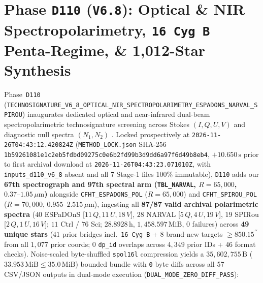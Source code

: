 \documentclass[twocolumn,10pt]{article}
\begin{document}
\section{Phase \texttt{D110} (\texttt{V6.8}): Optical \& NIR Spectropolarimetry, \texttt{16\,Cyg\,B} Penta-Regime, \& 1,012-Star Synthesis}
\label{sec:d110}
Phase~\texttt{D110} (\texttt{TECHNOSIGNATURE\_\allowbreak V6\_8\_\allowbreak OPTICAL\_\allowbreak NIR\_\allowbreak SPECTROPOLARIMETRY\_\allowbreak ESPADONS\_\allowbreak NARVAL\_\allowbreak SPIROU}) inaugurates dedicated optical and near-infrared dual-beam spectropolarimetric technosignature screening across Stokes $(I, Q, U, V)$ and diagnostic null spectra $(N_1, N_2)$ \cite{Donati1997,Auriere2003,Petit2014,Donati2020,Cook2022}. Locked prospectively at \texttt{2026-11-26T04:43:12.420824Z} (\texttt{METHOD\_LOCK.json} SHA-256 \texttt{1b592610\allowbreak 81e1c2eb\allowbreak 5fdbd092\allowbreak 75c0e6b2\allowbreak fd99b3d9\allowbreak dd6a97f6\allowbreak d49b8eb4}, $+10.650\,\text{s}$ prior to first archival download at \texttt{2026-11-26T04:43:23.071010Z}, with \texttt{inputs\_d110\_v6\_8} absent and all 7 Stage-1 files 100\% immutable), \texttt{D110} adds our \textbf{67th spectrograph and 97th spectral arm (\texttt{TBL\_NARVAL}, $R=65{,}000$, $0.37\text{--}1.05\,\mu\text{m}$)} alongside \texttt{CFHT\_ESPADONS\_POL} ($R=65{,}000$) and \texttt{CFHT\_SPIROU\_POL} ($R=70{,}000$, $0.955\text{--}2.515\,\mu\text{m}$), ingesting all \textbf{87/87 valid archival polarimetric spectra} ($40$ ESPaDOnS [$11\,Q, 11\,U, 18\,V$], $28$ NARVAL [$5\,Q, 4\,U, 19\,V$], $19$ SPIRou [$2\,Q, 1\,U, 16\,V$]; $11$ Ctrl / $76$ Sci; $28.8928\,\text{h}$, $1{,}458.597\,\mathrm{MiB}$, $0$ failures) across \textbf{49 unique stars} ($41$ prior bridges incl.\ \texttt{16\,Cyg\,B} + $8$ brand-new targets $\ge 850.15^{\prime\prime}$ from all $1{,}077$ prior coords; $0$ \texttt{dp\_id} overlaps across $4{,}349$ prior IDs + $46$ format checks). Noise-scaled byte-shuffled \texttt{spol16l} compression yields a $35{,}602{,}755\,\text{B}$ ($33.953\,\mathrm{MiB} \le 35.0\,\mathrm{MiB}$) bounded bundle with \texttt{0} byte diffs across all 57 CSV/JSON outputs in dual-mode execution (\texttt{DUAL\_MODE\_ZERO\_DIFF\_PASS}):
\end{document}
